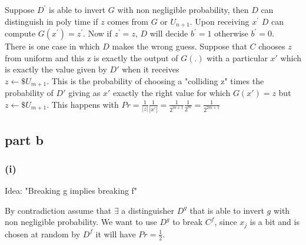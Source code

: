 \documentclass[11pt]{article}
\newcounter{t0d0_counter}
\begin{document}
Suppose $D^\prime$ is able to invert $G$ with non negligible probability, then $D$ can distinguish in poly time if $z$ comes from $G$ or $U_{n+1}$. 
Upon receiving $x^\prime$ $D$ can compute $G(x^\prime)=z^\prime$.
Now if $z^\prime=z$, $D$ will decide $b^\prime=1$ otherwise $b^\prime=0$.\\

There is one case in which $D$ makes the wrong guess. Suppose that $C$ chooses $z$ from uniform and this z is exactly the output of $G(.)$ with a particular $x'$ which is exactly the value given by $D'$ when it receives \\$z\leftarrow\$U_{m+1}$. This is the probability of choosing a "colliding z" times the probability of $D'$ giving as $x'$ exactly the right value for which $G(x')=z$ but $z\leftarrow\$U_{m+1}$. This happens with $Pr=\frac{1}{|z|}\frac{1}{|x'|}=\frac{1}{2^{m+1}}\frac{1}{2^m}=\frac{1}{2^{2m+1}}$

\newpage
\subsection{part b}
\subsubsection{(i)}
Idea: "Breaking g implies breaking f"
\begin{figure}[h!]
   \centering
   \sdinit{}
\end{figure}

By contradiction assume that $\exists$ a distinguisher $D^g$ that is able to invert $g$ with non negligible probability.
We want to use $D^g$ to break $C^f$, since $x_j$ is a bit and is chosen at random by $D^f$ it will have $Pr=\frac{1}{2}$. 
\end{document}
